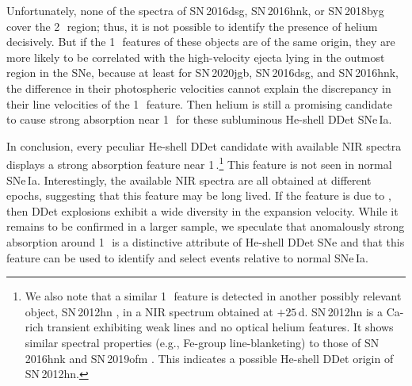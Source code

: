 \documentclass[twocolumn]{aastex631}
\newcommand{\sn}{SN\,2020jgb}
\begin{document}
Unfortunately, none of the spectra of SN\,2016dsg, SN\,2016hnk, or SN\,2018byg cover the 2\,\micron\ region; thus, it is not possible to identify the presence of helium decisively. But if the 1\,\micron\ features of these objects are of the same origin, they are more likely to be correlated with the high-velocity ejecta lying in the outmost region in the SNe, because at least for \sn, SN\,2016dsg, and SN\,2016hnk, the difference in their photospheric velocities cannot explain the discrepancy in their line velocities of the 1\,\micron\ feature. Then helium is still a promising candidate to cause strong absorption near 1\,\micron\ for these subluminous He-shell DDet SNe\,Ia.

In conclusion, every peculiar He-shell DDet candidate with available NIR spectra displays a strong absorption feature near 1\,\micron.\footnote{We also note that a similar 1\,\micron\ feature is detected in another possibly relevant object, SN\,2012hn \citep{Valenti_12hn_2014}, in a NIR spectrum obtained at $+25$\,d. SN\,2012hn is a Ca-rich transient exhibiting weak  lines and no optical helium features. %
It shows similar spectral properties (e.g., Fe-group line-blanketing) to those of SN\,2016hnk and SN\,2019ofm \citep{de_Ca_rich_2020}. This indicates a possible He-shell DDet origin of SN\,2012hn.} 
This feature is not seen in normal SNe\,Ia. Interestingly, the available NIR spectra are all obtained at different epochs, suggesting that this feature may be long lived. If the feature is due to , then DDet explosions exhibit a wide diversity in the expansion velocity. While it remains to be confirmed in a larger sample, we speculate that anomalously strong absorption around 1\,\micron\ is a distinctive attribute of He-shell DDet SNe and that this feature can be used to identify and select events relative to normal SNe\,Ia.
\end{document}
